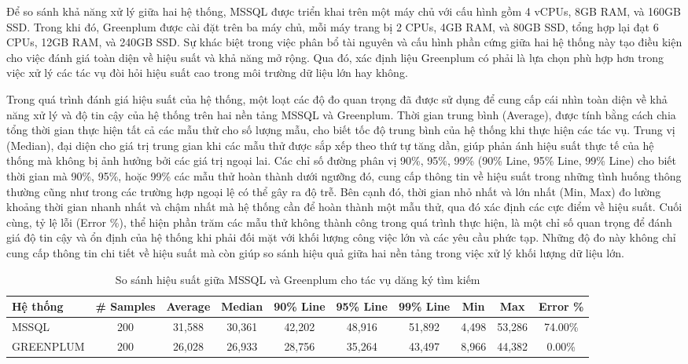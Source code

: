 \documentclass{article}[14pt]
\begin{document}
Để so sánh khả năng xử lý giữa hai hệ thống, MSSQL được triển khai trên một máy chủ với cấu hình gồm 4 vCPUs, 8GB RAM, và 160GB SSD. Trong khi đó, Greenplum được cài đặt trên ba máy chủ, mỗi máy trang bị 2 CPUs, 4GB RAM, và 80GB SSD, tổng hợp lại đạt 6 CPUs, 12GB RAM, và 240GB SSD. Sự khác biệt trong việc phân bổ tài nguyên và cấu hình phần cứng giữa hai hệ thống này tạo điều kiện cho việc đánh giá toàn diện về hiệu suất và khả năng mở rộng. Qua đó, xác định liệu Greenplum có phải là lựa chọn phù hợp hơn trong việc xử lý các tác vụ đòi hỏi hiệu suất cao trong môi trường dữ liệu lớn hay không.

Trong quá trình đánh giá hiệu suất của hệ thống, một loạt các độ đo quan trọng đã được sử dụng để cung cấp cái nhìn toàn diện về khả năng xử lý và độ tin cậy của hệ thống trên hai nền tảng MSSQL và Greenplum. Thời gian trung bình (Average), được tính bằng cách chia tổng thời gian thực hiện tất cả các mẫu thử cho số lượng mẫu, cho biết tốc độ trung bình của hệ thống khi thực hiện các tác vụ. Trung vị (Median), đại diện cho giá trị trung gian khi các mẫu thử được sắp xếp theo thứ tự tăng dần, giúp phản ánh hiệu suất thực tế của hệ thống mà không bị ảnh hưởng bởi các giá trị ngoại lai. Các chỉ số đường phân vị 90\%, 95\%, 99\% (90\% Line, 95\% Line, 99\% Line) cho biết thời gian mà 90\%, 95\%, hoặc 99\% các mẫu thử hoàn thành dưới ngưỡng đó, cung cấp thông tin về hiệu suất trong những tình huống thông thường cũng như trong các trường hợp ngoại lệ có thể gây ra độ trễ. Bên cạnh đó, thời gian nhỏ nhất và lớn nhất (Min, Max) đo lường khoảng thời gian nhanh nhất và chậm nhất mà hệ thống cần để hoàn thành một mẫu thử, qua đó xác định các cực điểm về hiệu suất. Cuối cùng, tỷ lệ lỗi (Error \%), thể hiện phần trăm các mẫu thử không thành công trong quá trình thực hiện, là một chỉ số quan trọng để đánh giá độ tin cậy và ổn định của hệ thống khi phải đối mặt với khối lượng công việc lớn và các yêu cầu phức tạp. Những độ đo này không chỉ cung cấp thông tin chi tiết về hiệu suất mà còn giúp so sánh hiệu quả giữa hai nền tảng trong việc xử lý khối lượng dữ liệu lớn.

\begin{table}[htbp]
\centering
\renewcommand{\arraystretch}{1.2}
\setlength{\tabcolsep}{4pt} 
\begin{tabular}{|l|c|c|c|c|c|c|c|c|c|}
\hline
\textbf{Hệ thống} & \textbf{\# Samples} & \textbf{Average} & \textbf{Median} & \textbf{90\% Line} & \textbf{95\% Line} & \textbf{99\% Line} & \textbf{Min} & \textbf{Max} & \textbf{Error \%} \\ \hline
MSSQL & 200 & 31,588 & 30,361 & 42,202 & 48,916 & 51,892 & 4,498 & 53,286 & 74.00\% \\ \hline
GREENPLUM & 200 & 26,028 & 26,933 & 28,756 & 35,264 & 43,497 & 8,966 & 44,382 & 0.00\% \\ \hline
\end{tabular}
\caption{So sánh hiệu suất giữa MSSQL và Greenplum cho tác vụ dăng ký tìm kiếm}
\label{tab:performance_comparison}
\end{table}
\end{document}
